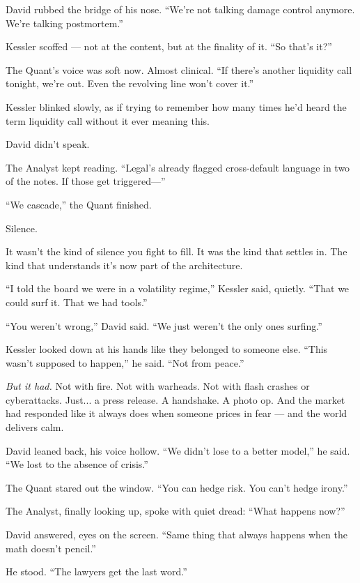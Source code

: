 David rubbed the bridge of his nose. “We’re not talking damage control anymore. We’re talking postmortem.”

Kessler scoffed — not at the content, but at the finality of it. “So that’s it?”

The Quant’s voice was soft now. Almost clinical. “If there’s another liquidity call tonight, we’re out. Even the revolving line won’t cover it.”

Kessler blinked slowly, as if trying to remember how many times he’d heard the term liquidity call without it ever meaning this.

David didn’t speak.

The Analyst kept reading. “Legal’s already flagged cross-default language in two of the notes. If those get triggered—”

“We cascade,” the Quant finished.

Silence.

It wasn’t the kind of silence you fight to fill.
It was the kind that settles in.
The kind that understands it’s now part of the architecture.

“I told the board we were in a volatility regime,” Kessler said, quietly. “That we could surf it. That we had tools.”

“You weren’t wrong,” David said. “We just weren’t the only ones surfing.”

Kessler looked down at his hands like they belonged to someone else.
“This wasn’t supposed to happen,” he said. “Not from peace.”

\textit{But it had.}
Not with fire. Not with warheads. Not with flash crashes or cyberattacks.
Just... a press release. A handshake. A photo op.
And the market had responded like it always does when someone prices in fear — and the world delivers calm.

David leaned back, his voice hollow.
“We didn’t lose to a better model,” he said. “We lost to the absence of crisis.”

The Quant stared out the window. “You can hedge risk. You can’t hedge irony.”

The Analyst, finally looking up, spoke with quiet dread:
“What happens now?”

David answered, eyes on the screen. “Same thing that always happens when the math doesn’t pencil.”

He stood. “The lawyers get the last word.”
